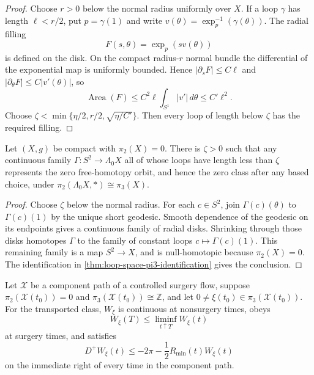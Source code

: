 \begin{proof}
Choose $r>0$ below the normal radius uniformly over $X$.  If a loop $\gamma$
has length $\ell<r/2$, put $p=\gamma(1)$ and write
$v(\theta)=\exp_p^{-1}(\gamma(\theta))$.  The radial filling
\[
 F(s,\theta)=\exp_p(sv(\theta))
\]
is defined on the disk.  On the compact radius-$r$ normal bundle the
differential of the exponential map is uniformly bounded.  Hence
$|\partial_sF|\le C\ell$ and
$|\partial_\theta F|\le C|v'(\theta)|$, so
\[
 \operatorname{Area}(F)\le C^2\ell\int_{S^1}|v'|\,d\theta\le C'\ell^2.
\]
Choose
$\zeta<\min\{\eta/2,r/2,\sqrt{\eta/C'}\}$.  Then every loop of length below
$\zeta$ has the required filling.
\end{proof}

\begin{lemma}
\label{lem:short-loop-families-trivial}
\notready
Let $(X,g)$ be compact with $\pi_2(X)=0$.  There is $\zeta>0$ such that any
continuous family $\Gamma\colon S^2\to\Lambda_0X$ all of whose loops have
length less than $\zeta$ represents the zero free-homotopy orbit, and hence
the zero class after any based choice, under
$\pi_2(\Lambda_0X,*)\cong\pi_3(X)$.
\end{lemma}

\begin{proof}
Choose $\zeta$ below the normal radius.  For each $c\in S^2$, join
$\Gamma(c)(\theta)$ to $\Gamma(c)(1)$ by the unique short geodesic.  Smooth
dependence of the geodesic on its endpoints gives a continuous family of
radial disks.  Shrinking through those disks homotopes $\Gamma$ to the family
of constant loops $c\mapsto\Gamma(c)(1)$.  This remaining family is a map
$S^2\to X$, and is null-homotopic because $\pi_2(X)=0$.  The identification
in \ref{thm:loop-space-pi3-identification} gives the conclusion.
\end{proof}

\begin{theorem}
\label{thm:loop-width-forward-inequality}
\notready
Let $\mathcal X$ be a component path of a controlled surgery flow, suppose
$\pi_2(\mathcal X(t_0))=0$ and
$\pi_3(\mathcal X(t_0))\cong\mathbb Z$, and let
$0\ne\xi(t_0)\in\pi_3(\mathcal X(t_0))$.  For the transported class,
$W_\xi$ is continuous at nonsurgery times, obeys
\[
 W_\xi(T)\le\liminf_{t\uparrow T}W_\xi(t)
\]
at surgery times, and satisfies
\[
 D^+W_\xi(t)
 \le-2\pi-\frac12R_{\min}(t)W_\xi(t)
\]
on the immediate right of every time in the component path.
\end{theorem}

